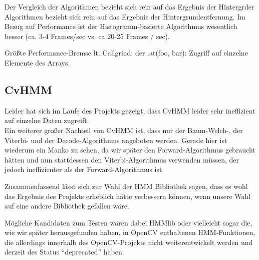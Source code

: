 Der Vergleich der Algorithmen bezieht sich rein auf das Ergebnis der Hintergrder Algorithmen bezieht sich rein auf das Ergebnis der Hintergrundentfernung.
Im Bezug auf Performance ist der Histogramm-basierte Algorithmus wesentlich besser (ca. 3-4 Frames/sec vs. ca 20-25 Frames / sec).

Größte Performance-Bremse lt. Callgrind: der .at(foo, bar): Zugriff auf einzelne Elemente des Arrays.

\subsection{CvHMM}
\label{sec:CvHMM}
Leider hat sich im Laufe des Projekts gezeigt, dass CvHMM leider sehr ineffizient auf einzelne Daten zugreift.\\

Ein weiterer großer Nachteil von CvHMM ist, dass nur der Baum-Welch-, der Viterbi- und der Decode-Algorithmus angeboten werden.
 Gerade hier ist wiederum ein Manko zu sehen, da wir später den Forward-Algorithmus gebraucht hätten und nun stattdessen den Viterbi-Algorithmus verwenden müssen, der jedoch ineffizienter als der Forward-Algorithmus ist.

Zusammenfassend lässt sich zur Wahl der HMM Bibliothek sagen, dass es wohl das Ergebnis des Projekts erheblich hätte verbessern können, wenn unsere Wahl auf eine andere Bibliothek gefallen wäre.

Mögliche Kandidaten zum Testen wären dabei HMMlib oder vielleicht sogar die, wie wir später herausgefunden haben, in OpenCV enthaltenen HMM-Funktionen, die allerdings innerhalb des OpenCV-Projekts nicht weiterentwickelt werden und derzeit des Status “deprecated” haben.
